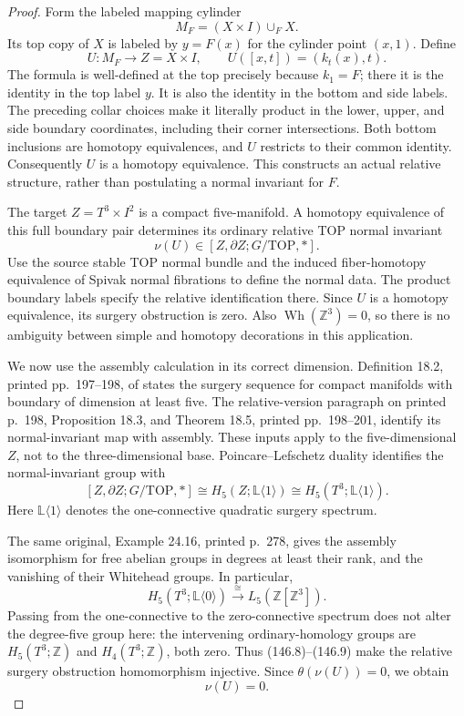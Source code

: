 \begin{proof}
Form the labeled mapping cylinder
\[
 M_F=(X\times I)\cup_F X.
\]
Its top copy of $X$ is labeled by $y=F(x)$ for the cylinder point
$(x,1)$. Define
\[
 U:M_F\longrightarrow Z=X\times I,\qquad
             U([x,t])=(k_t(x),t).
 \tag{146.6}
\]
The formula is well-defined at the top precisely because $k_1=F$;
there it is the identity in the top label $y$. It is also the
identity in the bottom and side labels. The preceding collar
choices make it literally product in the lower, upper, and side
boundary coordinates, including their corner intersections.
Both bottom inclusions are homotopy equivalences, and $U$
restricts to their common identity. Consequently $U$ is a
homotopy equivalence. This constructs an actual relative
structure, rather than postulating a normal invariant for $F$.

The target $Z=T^3\times I^2$ is a compact five-manifold. A homotopy
equivalence of this full boundary pair determines its ordinary
relative TOP normal invariant
\[
               \nu(U)\in[Z,\partial Z;G/\mathrm{TOP},*].
 \tag{146.7}
\]
Use the source stable TOP normal bundle and the induced
fiber-homotopy equivalence of Spivak normal fibrations to define
the normal data. The product boundary labels specify the relative
identification there. Since $U$ is a homotopy equivalence, its
surgery obstruction is zero. Also
$\operatorname{Wh}(\mathbb Z^3)=0$, so there is no ambiguity between
simple and homotopy decorations in this application.

We now use the assembly calculation in its correct dimension.
Definition 18.2, printed pp.~197--198, of
\cite{Ranicki1992TopologicalManifolds} states the surgery sequence
for compact manifolds with boundary of dimension at least five.
The relative-version paragraph on printed p.~198, Proposition 18.3,
and Theorem 18.5, printed pp.~198--201, identify its normal-invariant
map with assembly. These inputs apply to the five-dimensional
$Z$, not to the three-dimensional base. Poincare--Lefschetz
duality identifies the normal-invariant group with
\[
 [Z,\partial Z;G/\mathrm{TOP},*]
           \cong H_5(Z;\mathbb L\langle1\rangle)
           \cong H_5(T^3;\mathbb L\langle1\rangle).
 \tag{146.8}
\]
Here $\mathbb L\langle1\rangle$ denotes the one-connective quadratic
surgery spectrum.

The same original, Example 24.16, printed p.~278, gives the
assembly isomorphism for free abelian groups in degrees at least
their rank, and the vanishing of their Whitehead groups. In
particular,
\[
 H_5(T^3;\mathbb L\langle0\rangle)
       \xrightarrow{\ \cong\ }L_5(\mathbb Z[\mathbb Z^3]).
 \tag{146.9}
\]
Passing from the one-connective to the zero-connective spectrum
does not alter the degree-five group here: the intervening
ordinary-homology groups are $H_5(T^3;\mathbb Z)$ and
$H_4(T^3;\mathbb Z)$, both zero. Thus (146.8)--(146.9) make the
relative surgery obstruction homomorphism injective. Since
$\theta(\nu(U))=0$, we obtain
\[
                             \nu(U)=0.
 \tag{146.10}
\]


\end{proof}
